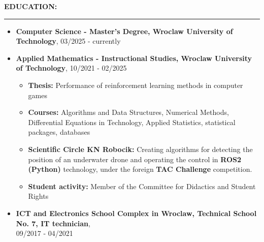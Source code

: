 \documentclass[10pt]{article}
\newcommand{\longline}{\rule{19.6cm}{1pt}}
\begin{document}
\newpage
\vspace*{10pt}
\noindent \fontsize{14pt}{14pt}\selectfont \textbf{\color{Violet}EDUCATION:}
\fontsize{10pt}{10pt}\selectfont 
\\ 
\noindent \longline 
\begin{itemize}[leftmargin=*]
    \item \textbf{Computer Science - Master's Degree, Wroclaw University of Technology}, 03/2025 - currently
    \item \textbf{Applied Mathematics - Instructional Studies, Wroclaw University of Technology}, 10/2021 - 02/2025
    \begin{itemize}
    \item \textbf{Thesis:} Performance of reinforcement learning methods in computer games
    \item \textbf{Courses:} Algorithms and Data Structures, Numerical Methods, Differential Equations in Technology, Applied Statistics, statistical packages, databases 
    \item \textbf{Scientific Circle KN Robocik:} Creating algorithms for detecting the position of an underwater drone and operating the control in \textbf{ROS2 (Python)} technology, under the foreign \textbf{TAC Challenge} competition.
    \item \textbf{Student activity:} Member of the Committee for Didactics and Student Rights
    \end{itemize}
    \item \textbf{ICT and Electronics School Complex in Wroclaw, Technical School No. 7, IT technician}, \\
    09/2017 - 04/2021 
\end{itemize}
\end{document}
